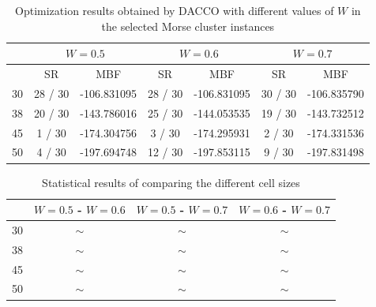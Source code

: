 		\begin{table}[!htdp]
				\begin{center}
					\begin{tabular}{| c | c | c | c | c | c | c |}
						\hline
						~ & \multicolumn{2}{c|}{\textbf{$W=0.5$}} & \multicolumn{2}{c|}{\textbf{$W=0.6$}} & \multicolumn{2}{c|}{\textbf{$W=0.7$}} \\ \hline
						~ & SR & MBF & SR & MBF & SR & MBF \\ \hline
						30 & 28 / 30 & -106.831095 & 28 / 30 & -106.831095 & 30 / 30 & -106.835790 \\ \hline
						38 & 20 / 30 & -143.786016 & 25 / 30 & -144.053535 & 19 / 30 & -143.732512 \\ \hline
						45 & 1 / 30 & -174.304756 & 3 / 30 & -174.295931 & 2 / 30 & -174.331536 \\ \hline
						50 & 4 / 30 & -197.694748 & 12 / 30 & -197.853115 & 9 / 30 & -197.831498 \\ \hline
					\end{tabular}
					\caption{Optimization results obtained by DACCO with different values of $W$ in the selected Morse cluster instances}
					\label{tab:cell_size_results}
				\end{center}
		\end{table}
		
		
		
		
		\begin{table}[!htdp]
				\begin{center}
					\begin{tabular}{| c | c | c | c |}
						\hline
						~& \textbf{$W=0.5$ - $W=0.6$} & \textbf{$W=0.5$ - $W=0.7$} & \textbf{$W=0.6$ - $W=0.7$} \\ \hline
						30 & $\sim$ & $\sim$ & $\sim$ \\ \hline
						38 & $\sim$ & $\sim$ & $\sim$ \\ \hline
						45 & $\sim$ & $\sim$ & $\sim$ \\ \hline
						50 & $\sim$ & $\sim$ & $\sim$ \\ \hline
					\end{tabular}
					\caption{Statistical results of comparing the different cell sizes}
					\label{tab:statistical_comparison_cell_size}
				\end{center}
		\end{table}
		
		
